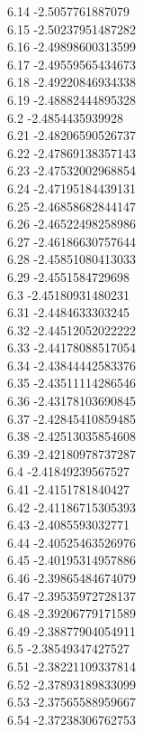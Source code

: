 {6.14	-2.5057761887079\\
6.15	-2.50237951487282\\
6.16	-2.49898600313599\\
6.17	-2.49559565434673\\
6.18	-2.49220846934338\\
6.19	-2.48882444895328\\
6.2	-2.4854435939928\\
6.21	-2.48206590526737\\
6.22	-2.47869138357143\\
6.23	-2.47532002968854\\
6.24	-2.47195184439131\\
6.25	-2.46858682844147\\
6.26	-2.46522498258986\\
6.27	-2.46186630757644\\
6.28	-2.45851080413033\\
6.29	-2.4551584729698\\
6.3	-2.45180931480231\\
6.31	-2.4484633303245\\
6.32	-2.44512052022222\\
6.33	-2.44178088517054\\
6.34	-2.43844442583376\\
6.35	-2.43511114286546\\
6.36	-2.43178103690845\\
6.37	-2.42845410859485\\
6.38	-2.42513035854608\\
6.39	-2.42180978737287\\
6.4	-2.41849239567527\\
6.41	-2.4151781840427\\
6.42	-2.41186715305393\\
6.43	-2.4085593032771\\
6.44	-2.40525463526976\\
6.45	-2.40195314957886\\
6.46	-2.39865484674079\\
6.47	-2.39535972728137\\
6.48	-2.39206779171589\\
6.49	-2.38877904054911\\
6.5	-2.38549347427527\\
6.51	-2.38221109337814\\
6.52	-2.37893189833099\\
6.53	-2.37565588959667\\
6.54	-2.37238306762753\\
}
